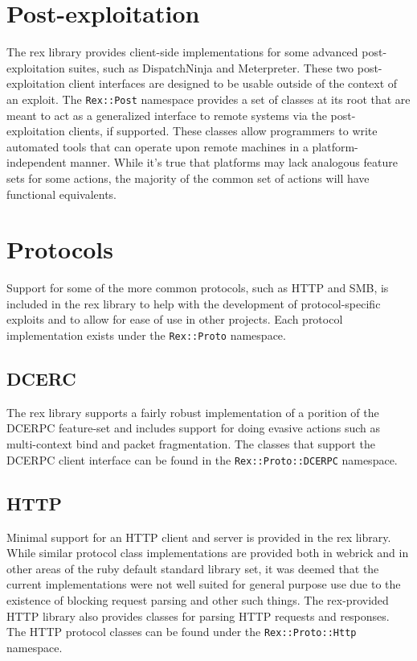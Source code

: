 \documentclass{report}
\begin{document}
    \section{Post-exploitation}

\par
The rex library provides client-side implementations for some
advanced post-exploitation suites, such as DispatchNinja and
Meterpreter. These two post-exploitation client interfaces are
designed to be usable outside of the context of an exploit.  The
\texttt{Rex::Post} namespace provides a set of classes at its root
that are meant to act as a generalized interface to remote systems
via the post-exploitation clients, if supported.  These classes
allow programmers to write automated tools that can operate upon
remote machines in a platform-independent manner.  While it's true
that platforms may lack analogous feature sets for some actions, the
majority of the common set of actions will have functional
equivalents.

    \section{Protocols}

\par
Support for some of the more common protocols, such as HTTP and SMB,
is included in the rex library to help with the development of
protocol-specific exploits and to allow for ease of use in other
projects.  Each protocol implementation exists under the
\texttt{Rex::Proto} namespace.

        \subsection{DCERC}

\par
The rex library supports a fairly robust implementation of a
porition of the DCERPC feature-set and includes support for doing
evasive actions such as multi-context bind and packet fragmentation.
The classes that support the DCERPC client interface can be found in
the \texttt{Rex::Proto::DCERPC} namespace.

        \subsection{HTTP}

\par
Minimal support for an HTTP client and server is provided in the rex
library.  While similar protocol class implementations are provided
both in webrick and in other areas of the ruby default standard
library set, it was deemed that the current implementations were not
well suited for general purpose use due to the existence of blocking
request parsing and other such things.  The rex-provided HTTP
library also provides classes for parsing HTTP requests and
responses.  The HTTP protocol classes can be found under the
\texttt{Rex::Proto::Http} namespace.
\end{document}
